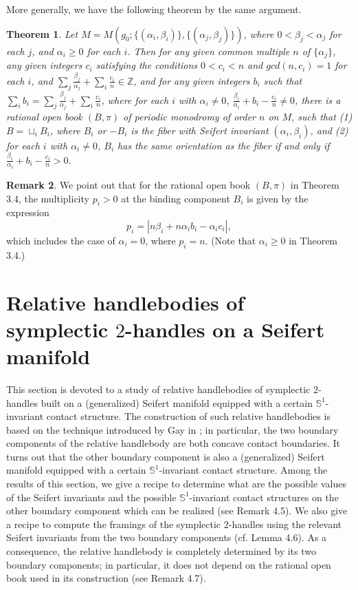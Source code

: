 \documentclass[11pt]{amsart}
\theoremstyle{plain}
\newtheorem{theorem}{Theorem}
\numberwithin{theorem}{section}
\theoremstyle{definition}
\newtheorem{remark}[theorem]{Remark}
\newcommand{\Z}{{\mathbb Z}}
\newcommand{\s}{{\mathbb S}}
\begin{document}
More generally, we have the following theorem by the same argument. 

\begin{theorem}
Let $M=M(g_0; \{(\alpha_i,\beta_i)\},\{(\alpha_j,\beta_j)\})$, where $0<\beta_j<\alpha_j$ for each $j$, and $\alpha_i\geq 0$ for each $i$. Then for any given common multiple $n$ of $\{\alpha_j\}$, any given integers $c_i$ satisfying the conditions $0<c_i<n$ and $gcd(n,c_i)=1$ for each $i$, and 
$\sum_j\frac{\beta_j}{\alpha_j}+\sum_i \frac{c_i}{n}\in\Z$, and for any given integers $b_i$ such that 
$\sum_i b_i=\sum_j\frac{\beta_j}{\alpha_j}+\sum_i \frac{c_i}{n}$, where for each $i$ with 
$\alpha_i\neq 0$, $\frac{\beta_i}{\alpha_i}+b_i-\frac{c_i}{n}\neq 0$, there is a rational open book 
$(B,\pi)$ of periodic monodromy of order $n$ on $M$, such that {\em(}1{\em)} $B=\sqcup_i B_i$, 
where $B_i$ or $-B_i$ is the fiber with Seifert invariant $(\alpha_i,\beta_i)$,  and {\em(}2{\em)} for each $i$ with
$\alpha_i\neq 0$, $B_i$ has the same orientation as the fiber if and only if 
$\frac{\beta_i}{\alpha_i}+b_i-\frac{c_i}{n}>0$.
\end{theorem}

\begin{remark}
We point out that for the rational open book $(B,\pi)$ in Theorem 3.4, the multiplicity $p_i>0$ at the binding component $B_i$ is given by the expression 
$$
p_i=|n\beta_i+n\alpha_i b_i-\alpha_i c_i|,
$$
which includes the case of $\alpha_i=0$, where $p_i=n$. (Note that $\alpha_i\geq 0$ in Theorem 3.4.)
\end{remark}

\section{Relative handlebodies of symplectic $2$-handles on a Seifert manifold}
This section is devoted to a study of relative handlebodies of symplectic $2$-handles built on a
(generalized) Seifert manifold equipped with a certain $\s^1$-invariant contact structure. The construction of such relative handlebodies is based on the technique introduced by Gay in \cite{G}; 
in particular, the two boundary components of the relative handlebody are both concave contact boundaries. It turns out that the other boundary component is also a (generalized) Seifert manifold equipped with a certain $\s^1$-invariant contact structure. Among the results of this section, we give a recipe to determine what are the possible values of the Seifert invariants and the possible $\s^1$-invariant contact structures on the other boundary component which can be realized (see Remark 4.5). We also give a recipe to compute the framings of the symplectic $2$-handles using the relevant Seifert invariants from the two boundary components (cf. Lemma 4.6). As a consequence,
the relative handlebody is completely determined by its two boundary components; in particular, it does not depend on the rational open book used in its construction (see Remark 4.7). 
\end{document}
